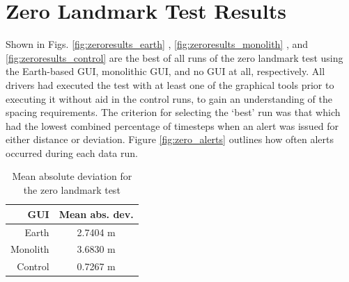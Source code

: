 \section{Zero Landmark Test Results} \label{sec:zerolandmarkresults}

Shown in Figs. \ref{fig:zeroresults_earth} , \ref{fig:zeroresults_monolith} , and \ref{fig:zeroresults_control} are the best of all runs of the zero landmark test using the Earth-based GUI, monolithic GUI, and no GUI at all, respectively. All drivers had executed the test with at least one of the graphical tools prior to executing it without aid in the control runs, to gain an understanding of the spacing requirements. The criterion for selecting the `best' run was that which had the lowest combined percentage of timesteps when an alert was issued for either distance or deviation. Figure \ref{fig:zero_alerts} outlines how often alerts occurred during each data run.

\begin{table}[htbp] \centering \caption{Mean absolute deviation for the zero landmark test}
\begin{tabular}{r|c} 
    GUI&    Mean abs. dev. \\ \hline\hline
    Earth&      2.7404 m \\
    Monolith&   3.6830 m \\
    Control&    0.7267 m \\ \hline   
\end{tabular} \label{tab:zero_dev_mean} \end{table}

